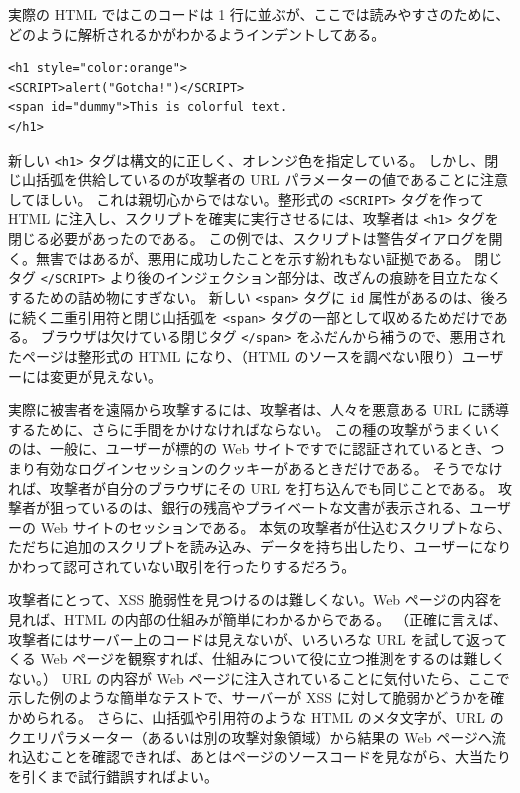 \documentclass[uplatex]{jsarticle}
\begin{document}
実際の HTML ではこのコードは 1 行に並ぶが、ここでは読みやすさのために、どのように解析されるかがわかるようインデントしてある。
\begin{verbatim}
<h1 style="color:orange">
<SCRIPT>alert("Gotcha!")</SCRIPT>
<span id="dummy">This is colorful text.
</h1>
\end{verbatim}

新しい \texttt{<h1>} タグは構文的に正しく、オレンジ色を指定している。
しかし、閉じ山括弧を供給しているのが攻撃者の URL パラメーターの値であることに注意してほしい。
これは親切心からではない。整形式の \texttt{<SCRIPT>} タグを作って HTML に注入し、スクリプトを確実に実行させるには、攻撃者は \texttt{<h1>} タグを閉じる必要があったのである。
この例では、スクリプトは警告ダイアログを開く。無害ではあるが、悪用に成功したことを示す紛れもない証拠である。
閉じタグ \texttt{</SCRIPT>} より後のインジェクション部分は、改ざんの痕跡を目立たなくするための詰め物にすぎない。
新しい \texttt{<span>} タグに \texttt{id} 属性があるのは、後ろに続く二重引用符と閉じ山括弧を \texttt{<span>} タグの一部として収めるためだけである。
ブラウザは欠けている閉じタグ \texttt{</span>} をふだんから補うので、悪用されたページは整形式の HTML になり、（HTML のソースを調べない限り）ユーザーには変更が見えない。

実際に被害者を遠隔から攻撃するには、攻撃者は、人々を悪意ある URL に誘導するために、さらに手間をかけなければならない。
この種の攻撃がうまくいくのは、一般に、ユーザーが標的の Web サイトですでに認証されているとき、つまり有効なログインセッションのクッキーがあるときだけである。
そうでなければ、攻撃者が自分のブラウザにその URL を打ち込んでも同じことである。
攻撃者が狙っているのは、銀行の残高やプライベートな文書が表示される、ユーザーの Web サイトのセッションである。
本気の攻撃者が仕込むスクリプトなら、ただちに追加のスクリプトを読み込み、データを持ち出したり、ユーザーになりかわって認可されていない取引を行ったりするだろう。

攻撃者にとって、XSS 脆弱性を見つけるのは難しくない。Web ページの内容を見れば、HTML の内部の仕組みが簡単にわかるからである。
（正確に言えば、攻撃者にはサーバー上のコードは見えないが、いろいろな URL を試して返ってくる Web ページを観察すれば、仕組みについて役に立つ推測をするのは難しくない。）
URL の内容が Web ページに注入されていることに気付いたら、ここで示した例のような簡単なテストで、サーバーが XSS に対して脆弱かどうかを確かめられる。
さらに、山括弧や引用符のような HTML のメタ文字が、URL のクエリパラメーター（あるいは別の攻撃対象領域）から結果の Web ページへ流れ込むことを確認できれば、あとはページのソースコードを見ながら、大当たりを引くまで試行錯誤すればよい。
\end{document}
